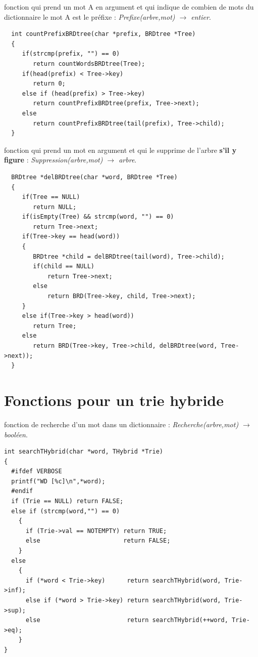 \documentclass[a4paper,8pt]{report}
\begin{document}
fonction qui prend un mot A en argument et qui indique de combien de mots du dictionnaire le mot A est le pr\'efixe : \textit{Prefixe(arbre,mot) $\rightarrow$ entier}.
\begin{verbatim}
  int countPrefixBRDtree(char *prefix, BRDtree *Tree)
  {
     if(strcmp(prefix, "") == 0)
        return countWordsBRDtree(Tree);
     if(head(prefix) < Tree->key)
        return 0;
     else if (head(prefix) > Tree->key)
        return countPrefixBRDtree(prefix, Tree->next);
     else
        return countPrefixBRDtree(tail(prefix), Tree->child);
  }
\end{verbatim}

fonction qui prend un mot en argument et qui le supprime de l'arbre \textbf{s'il y figure} : \textit{Suppression(arbre,mot) $\rightarrow$ arbre}.
\begin{verbatim}
  BRDtree *delBRDtree(char *word, BRDtree *Tree)
  {
     if(Tree == NULL)
        return NULL;
     if(isEmpty(Tree) && strcmp(word, "") == 0)
        return Tree->next;
     if(Tree->key == head(word))
     {
        BRDtree *child = delBRDtree(tail(word), Tree->child);
        if(child == NULL)
            return Tree->next;
        else
            return BRD(Tree->key, child, Tree->next);
     }
     else if(Tree->key > head(word))
        return Tree;
     else
        return BRD(Tree->key, Tree->child, delBRDtree(word, Tree->next));
  }
\end{verbatim}

\section*{Fonctions pour un trie hybride}\label{sec:name}

fonction de recherche d'un mot dans un dictionnaire : \textit{Recherche(arbre,mot) $\rightarrow$ bool\'een}.
\begin{verbatim}
int searchTHybrid(char *word, THybrid *Trie)
{
  #ifdef VERBOSE
  printf("WD [%c]\n",*word);
  #endif
  if (Trie == NULL) return FALSE;
  else if (strcmp(word,"") == 0)
    {
      if (Trie->val == NOTEMPTY) return TRUE;
      else                       return FALSE;
    }
  else
    {
      if (*word < Trie->key)      return searchTHybrid(word, Trie->inf);
      else if (*word > Trie->key) return searchTHybrid(word, Trie->sup);
      else                        return searchTHybrid(++word, Trie->eq);
    }
}
\end{verbatim}
\end{document}
